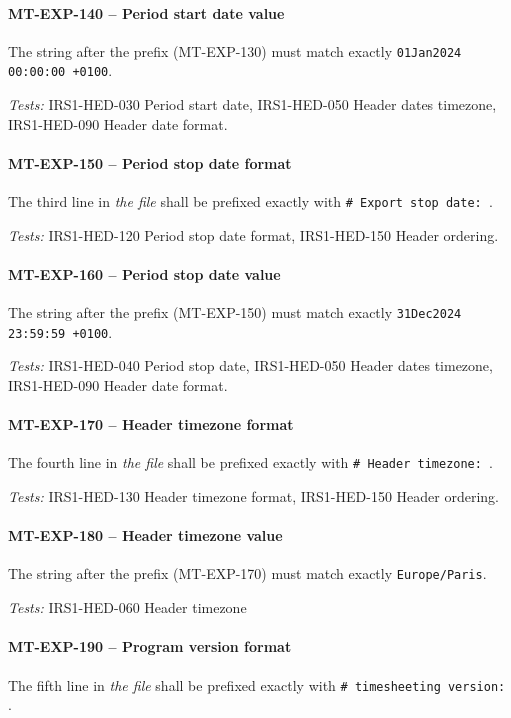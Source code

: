 \paragraph{MT-EXP-140 -- Period start date value}
The string after the prefix (MT-EXP-130) must match exactly
\lstinline{01Jan2024 00:00:00 +0100}.

\textit{Tests: } IRS1-HED-030 Period start date, IRS1-HED-050 Header dates
timezone, IRS1-HED-090 Header date format.

\paragraph{MT-EXP-150 -- Period stop date format}
The third line in \emph{the file} shall be prefixed exactly with
\lstinline{# Export stop date: }.

\textit{Tests: } IRS1-HED-120 Period stop date format, IRS1-HED-150 Header
ordering.

\paragraph{MT-EXP-160 -- Period stop date value}
The string after the prefix (MT-EXP-150) must match exactly
\lstinline{31Dec2024 23:59:59 +0100}.

\textit{Tests: } IRS1-HED-040 Period stop date, IRS1-HED-050 Header dates
timezone, IRS1-HED-090 Header date format.

\paragraph{MT-EXP-170 -- Header timezone format}
The fourth line in \emph{the file} shall be prefixed exactly with
\lstinline{# Header timezone: }.

\textit{Tests: } IRS1-HED-130 Header timezone format, IRS1-HED-150 Header
ordering.

\paragraph{MT-EXP-180 -- Header timezone value}
The string after the prefix (MT-EXP-170) must match exactly
\lstinline{Europe/Paris}.

\textit{Tests: } IRS1-HED-060 Header timezone

\paragraph{MT-EXP-190 -- Program version format}
The fifth line in \emph{the file} shall be prefixed exactly with
\lstinline{# timesheeting version: }.

